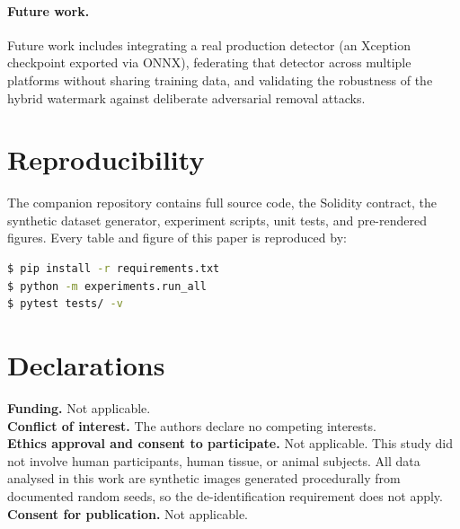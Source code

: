 \documentclass[11pt,a4paper]{article}
\theoremstyle{definition}
\theoremstyle{plain}
\theoremstyle{remark}
\begin{document}
\paragraph{Future work.}
Future work includes integrating a real production detector
(an Xception checkpoint exported via ONNX), federating that
detector across multiple platforms without sharing training
data, and validating the robustness of the hybrid watermark
against deliberate adversarial removal attacks.

\section*{Reproducibility}

The companion repository contains full source code, the Solidity
contract, the synthetic dataset generator, experiment scripts, unit
tests, and pre-rendered figures. Every table and figure of this paper
is reproduced by:
\begin{lstlisting}[language=bash, basicstyle=\ttfamily\footnotesize]
$ pip install -r requirements.txt
$ python -m experiments.run_all
$ pytest tests/ -v
\end{lstlisting}

\section*{Declarations}
\noindent\textbf{Funding.} Not applicable.\\[2pt]
\textbf{Conflict of interest.} The authors declare no competing
interests.\\[2pt]
\textbf{Ethics approval and consent to participate.} Not applicable.
This study did not involve human participants, human tissue, or
animal subjects. All data analysed in this work are synthetic
images generated procedurally from documented random seeds, so the
de-identification requirement does not apply.\\[2pt]
\textbf{Consent for publication.} Not applicable.
\end{document}
